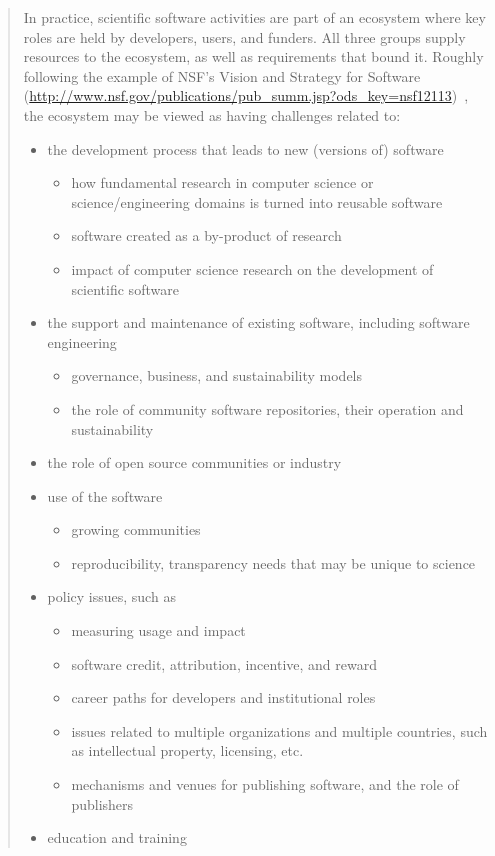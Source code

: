\documentclass[11pt, oneside]{amsart}
\begin{document}
\begin{quote}
In practice, scientific software activities are part of an ecosystem
where key roles are held by developers, users, and funders. All three
groups supply resources to the ecosystem, as well as requirements that
bound it. Roughly following the example of NSF's Vision and Strategy
for Software
(\url{http://www.nsf.gov/publications/pub_summ.jsp?ods_key=nsf12113})~\cite{NSF_software_vision},
the ecosystem may be viewed as having challenges related to:

\begin{itemize}[leftmargin=0.2in]
\item the development process that leads to new (versions of) software
\begin{itemize}[leftmargin=0.2in]
\item how fundamental research in computer science or
  science/engineering domains is turned into reusable software
\item software created as a by-product of research
\item impact of computer science research on the development of
  scientific software
\end{itemize}
\item the support and maintenance of existing software, including
  software engineering
\begin{itemize}[leftmargin=0.2in]
\item governance, business, and sustainability models
\item the role of community software repositories, their operation and
  sustainability
\end{itemize}
\item the role of open source communities or industry
\item use of the software
\begin{itemize}[leftmargin=0.2in]
\item growing communities
\item reproducibility, transparency needs that may be unique to science
\end{itemize}
\item policy issues, such as
\begin{itemize}[leftmargin=0.2in]
\item measuring usage and impact
\item software credit, attribution, incentive, and reward
\item career paths for developers and institutional roles
\item issues related to multiple organizations and multiple countries,
  such as intellectual property, licensing, etc.
\item mechanisms and venues for publishing software, and the role of
  publishers
\end{itemize}
\item education and training
\end{itemize}

\end{quote}
\end{document}
